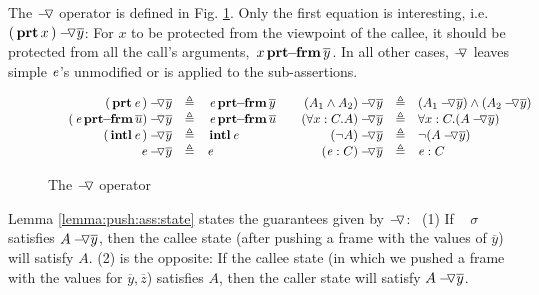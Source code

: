 {{The  $\pushSymbolAA$  operator is  defined in Fig. \ref{f:Push}. Only the first equation is interesting, i.e.  $\PushAS y {(\inside x)}$: For 
$x$ to be protected from the viewpoint of the callee, it should be protected from all the call's arguments,
\ie  $\protectedFrom x {\overline {y}}$. 
In all other cases,   $\pushSymbolA$  leaves simple $\re$'s unmodified %
 or is applied to the sub-assertions. %


\begin{figure}[hbt]
$
\begin{array}{c}
\begin{array}{l}
\begin{array}{rclcrcl}
  \PushAS y {(\inside \re)} & \triangleq &  \protectedFrom \re {\overline {y} }
  & &
  \PushAS y   {(A_1  \wedge  A_2)} & \triangleq &  (\PushAS y  { A_1})  \wedge  ( \PushAS y  {A_2} )  
\\ 
 \PushAS y {(\protectedFrom \re {\overline {u}})} &  \triangleq& \protectedFrom \re {\overline {u}} 
  & &
 \PushAS y  {(\forall x:C.A)} & \triangleq & \forall x:C.({\PushAS y A} )  
  \\  
  \PushAS y  {(\internal \re)} &  \triangleq & {\internal \re}  %
  & & 
  \PushAS y  {(\neg A)} &  \triangleq & \neg( {\PushAS y A} )  
    \\
     \PushAS y  {\re} &  \triangleq&   \re %
    & &
    \PushAS y  {(\re:C)} &  \triangleq&   \re:C 
 \end{array}
\end{array}
\end{array}
$
\caption{The $\pushSymbolAA$  operator  } 
\label{f:Push}
\end{figure}


\newcommand{\sigmas}{\widetilde \sigma}



\vspace{.1cm}

 Lemma \ref{lemma:push:ass:state} states the guarantees given by $\pushSymbolAA$: \  (1) If \ %
$\sigma$ satisfies  $\PushAS y A$, then   { the callee state (after pushing a frame with the values of $\overline y$) 
will satisfy $A$}. %
(2) is the opposite: {If the callee state (in which we pushed a frame with the values for $\overline y, \overline z$) satisfies $A$, then the
caller state will satisfy 
$\PushAS {y} {A}$. } %

}}
